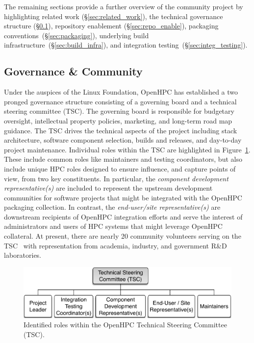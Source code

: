 \documentclass{sig-alternate-05-2015}
\begin{document}

The remaining sections provide a further overview of the community project
by highlighting related work (\S\ref{sec:related_work}), the technical governance
structure (\S\ref{sec:governance}), repository enablement (\S\ref{sec:repo_enable}), packaging
conventions~(\S\ref{sec:packaging}), underlying build
infrastructure~(\S\ref{sec:build_infra}), and integration testing~(\S\ref{sec:integ_testing}).

\newpage


\subsection{Governance \& Community} \label{sec:governance}
Under the auspices of the Linux Foundation, OpenHPC has established a two
pronged governance structure consisting of a governing board and a technical
steering committee (TSC). The governing board is responsible for budgetary
oversight, intellectual property policies, marketing, and long-term road map
guidance. The TSC drives the technical aspects of the project including stack
architecture, software component selection, builds and releases, and day-to-day
project maintenance. Individual roles within the TSC are highlighted in
Figure~\ref{fig:tsc_governance}.  These include common roles like maintainers
and testing coordinators, but also include unique HPC roles designed to ensure
influence, and capture points of view, from two key constituents. In particular,
the {\em component development representative(s)} are included to represent the
upstream development communities for software projects that might be integrated
with the OpenHPC packaging collection. In contrast, the {\em end-user/site
  representative(s)} are downstream recipients of OpenHPC integration efforts
and serve the interest of administrators and users of HPC systems that might leverage
OpenHPC collateral.  At present, there are nearly 20 community volunteers
serving on the TSC~\cite{TSC_url} with representation from academia, industry,
and government R\&D laboratories.


\begin{figure}
  \includegraphics[width=1.0\linewidth]{figures/governance}
  \caption{Identified roles within the OpenHPC Technical Steering Committee (TSC).}
  \label{fig:tsc_governance}
\end{figure}
\end{document}
